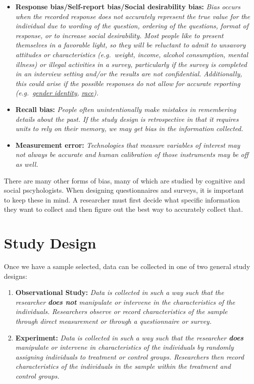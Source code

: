 \documentclass[
]{book}
\providecommand{\tightlist}{%
  \setlength{\itemsep}{0pt}\setlength{\parskip}{0pt}}
\begin{document}
\begin{itemize}
\tightlist
\item
  \textbf{Response bias/Self-report bias/Social desirability bias:} \emph{Bias occurs when the recorded response does not accurately represent the true value for the individual due to wording of the question, ordering of the questions, format of response, or to increase social desirability. Most people like to present themselves in a favorable light, so they will be reluctant to admit to unsavory attitudes or characteristics (e.g.~weight, income, alcohol consumption, mental illness) or illegal activities in a survey, particularly if the survey is completed in an interview setting and/or the results are not confidential. Additionally, this could arise if the possible responses do not allow for accurate reporting (e.g.~\href{https://www.hrc.org/resources/collecting-transgender-inclusive-gender-data-in-workplace-and-other-surveys}{gender identity}, \href{https://www.pewsocialtrends.org/interactives/multiracial-timeline/}{race}).}
\item
  \textbf{Recall bias:} \emph{People often unintentionally make mistakes in remembering details about the past. If the study design is retrospective in that it requires units to rely on their memory, we may get bias in the information collected.}
\item
  \textbf{Measurement error:} \emph{Technologies that measure variables of interest may not always be accurate and human calibration of those instruments may be off as well.}
\end{itemize}

There are many other forms of bias, many of which are studied by cognitive and social pscyhologists. When designing questionnaires and surveys, it is important to keep these in mind. A researcher must first decide what specific information they want to collect and then figure out the best way to accurately collect that.

\hypertarget{study-design}{%
\section{Study Design}\label{study-design}}

Once we have a sample selected, data can be collected in one of two general study designs:

\begin{enumerate}
\def\labelenumi{\arabic{enumi}.}
\item
  \textbf{Observational Study:} \emph{Data is collected in such a way such that the researcher \textbf{does not} manipulate or intervene in the characteristics of the individuals. Researchers observe or record characteristics of the sample through direct measurement or through a questionnaire or survey.}
\item
  \textbf{Experiment:} \emph{Data is collected in such a way such that the researcher \textbf{does} manipulate or intervene in characteristics of the individuals by randomly assigning individuals to treatment or control groups. Researchers then record characteristics of the individuals in the sample within the treatment and control groups.}
\end{enumerate}
\end{document}
